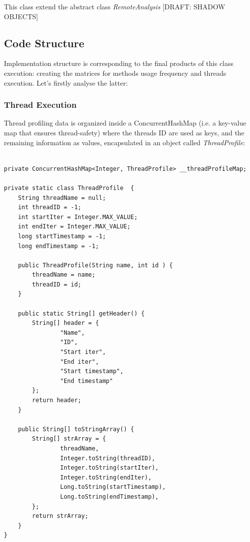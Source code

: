 \documentclass[]{usiinfthesis}
\begin{document}
\noindent
This class extend the abstract class \textit{RemoteAnalysis} [DRAFT: SHADOW OBJECTS]

\subsection{Code Structure}
Implementation structure is corresponding to the final products of this class execution: creating the matrices for methods usage frequency and threads execution. Let's firstly analyse the latter:

\subsubsection{Thread Execution}
Thread profiling data is organized inside a ConcurrentHashMap (i.e. a key-value map that ensures thread-safety) where the threads ID are used as keys, and the remaining information as values, encapsulated in an object called \textit{ThreadProfile}:

    \vspace*{0.25cm}
        \begin{verbatim}

private ConcurrentHashMap<Integer, ThreadProfile> __threadProfileMap;
        
private static class ThreadProfile  {
    String threadName = null;
    int threadID = -1;
    int startIter = Integer.MAX_VALUE;
    int endIter = Integer.MAX_VALUE;
    long startTimestamp = -1;
    long endTimestamp = -1;

    public ThreadProfile(String name, int id ) {
        threadName = name;
        threadID = id;
    }

    public static String[] getHeader() {
        String[] header = {
                "Name",
                "ID",
                "Start iter",
                "End iter",
                "Start timestamp",
                "End timestamp"
        };
        return header;
    }

    public String[] toStringArray() {
        String[] strArray = {
                threadName,
                Integer.toString(threadID),
                Integer.toString(startIter),
                Integer.toString(endIter),
                Long.toString(startTimestamp),
                Long.toString(endTimestamp),
        };
        return strArray;
    }
}
    \end{verbatim}
    \vspace*{0.25cm}
    
\end{document}
